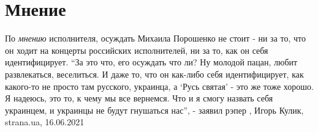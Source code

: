  
 
 
 
 

\chapter{Мнение}
\label{sec:slova.mnenie}

По \emph{мнению} исполнителя, осуждать Михаила Порошенко не стоит - ни за то,
что он ходит на концерты российских исполнителей, ни за то, как он себя
идентифицирует.  \enquote{За это что, его осуждать что ли? Ну молодой пацан,
любит развлекаться, веселиться. И даже то, что он как-либо себя идентифицирует,
как какого-то не просто там русского, украинца, а \enquote{Русь святая} - это
же тоже хорошо. Я надеюсь, это то, к чему мы все вернемся. Что и я смогу
назвать себя украинцем, и украинцы не будут гнушаться нас}, - заявил рэпер
, 
Игорь Кулик, strana.ua, 16.06.2021

